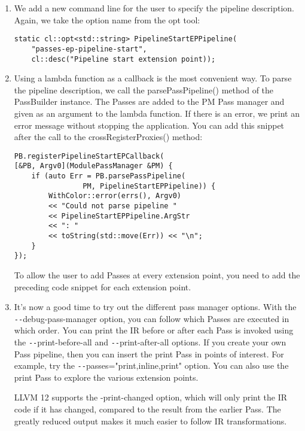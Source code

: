 \begin{enumerate}
\item We add a new command line for the user to specify the pipeline description. Again, we take the option name from the opt tool:
\begin{lstlisting}[caption={}]
static cl::opt<std::string> PipelineStartEPPipeline(
	"passes-ep-pipeline-start",
	cl::desc("Pipeline start extension point));
\end{lstlisting}

\item Using a lambda function as a callback is the most convenient way. To parse the pipeline description, we call the parsePassPipeline() method of the PassBuilder instance. The Passes are added to the PM Pass manager and given as an argument to the lambda function. If there is an error, we print an error message without stopping the application. You can add this snippet after the call to the crossRegisterProxies() method:
\begin{lstlisting}[caption={}]
PB.registerPipelineStartEPCallback(
[&PB, Argv0](ModulePassManager &PM) {
	if (auto Err = PB.parsePassPipeline(
				PM, PipelineStartEPPipeline)) {
		WithColor::error(errs(), Argv0)
		<< "Could not parse pipeline "
		<< PipelineStartEPPipeline.ArgStr 
		<< ": "
		<< toString(std::move(Err)) << "\n";
	}
});
\end{lstlisting}
\begin{tcolorbox}[colback=blue!5!white,colframe=blue!75!black, title=Tip]
To allow the user to add Passes at every extension point, you need to add the preceding code snippet for each extension point.
\end{tcolorbox}

\item It's now a good time to try out the different pass manager options. With the \verb|--|debug-pass-manager option, you can follow which Passes are executed in which order. You can print the IR before or after each Pass is invoked using the \verb|--|print-before-all and \verb|--|print-after-all options. If you create your own Pass pipeline, then you can insert the print Pass in points of interest. For example, try the \verb|--|passes="print,inline,print" option. You can also use 
the print Pass to explore the various extension points.

\begin{tcolorbox}[colback=blue!5!white,colframe=mymauve!75!black, title=New print options in LLVM 12]
LLVM 12 supports the -print-changed option, which will only print the IR code if it has changed, compared to the result from the earlier Pass. The greatly reduced output makes it much easier to follow IR transformations.
\end{tcolorbox}


\end{enumerate}
